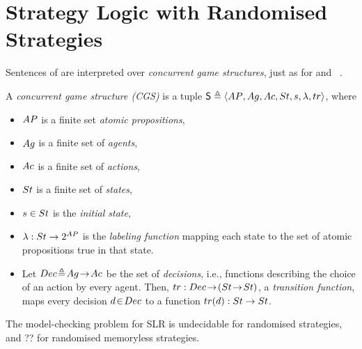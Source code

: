 
\section{Strategy Logic with Randomised Strategies}

Sentences of \SLR are interpreted over \emph{concurrent game
structures}, just as for \ATL and \SL~\cite{AHK02,MMPV14}.
		


\begin{definition}
\label{CGS}
A \emph{concurrent game structure (CGS)} 
is a tuple $\mathsf{S} \triangleq \langle {{AP}, {Ag}, Ac, St, s, \lambda, tr} \rangle$,
			where 
			\begin{itemize}
			\item ${AP}$ is a finite set \emph{atomic propositions}, 
			\item ${Ag}$ is a finite set of 			\emph{agents},
			\item $Ac$ is a finite set of \emph{actions},
			\item $St$ is a 	finite set of		\emph{states},
			\item $s \in St$ is the \emph{initial
			state},  
			\item $\lambda: St \to 2^{{AP}}$ is the \emph{labeling
			function} mapping each state to the set of atomic propositions true in
			that state.
			\item Let $Dec \!\triangleq\! {Ag} \!\to\! Ac$ be the
			set of \emph{decisions}, i.e., functions describing the choice
			of an action by every agent. Then, $tr : Dec \!\to\! (St
			\!\to\! St)$, a \emph{transition function}, maps every
			decision $d \!\in\! Dec$ to a function
			$tr(d): St \to St$.
			\end{itemize}
		\end{definition}

\begin{theorem}
The model-checking problem for SLR is undecidable for randomised strategies, and ?? for randomised memoryless strategies.
\end{theorem}

		\iffalse
		
